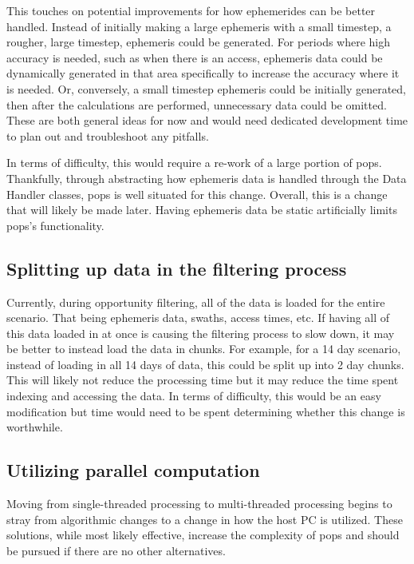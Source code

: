 This touches on potential improvements for how ephemerides can be better
handled.  Instead of initially making a large ephemeris with a small timestep,
a rougher, large timestep, ephemeris could be generated.  For periods where
high accuracy is needed, such as when there is an access, ephemeris data could
be dynamically generated in that area specifically to increase the accuracy
where it is needed. Or, conversely, a small timestep ephemeris could be
initially generated, then after the calculations are performed, unnecessary
data could be omitted. These are both general ideas for now and would need
dedicated development time to plan out and troubleshoot any pitfalls.

In terms of difficulty, this would require a re-work of a large portion of
\gls{pops}.  Thankfully, through abstracting how ephemeris data is handled
through the Data Handler classes, \gls{pops} is well situated for this change.
Overall, this is a change that will likely be made later.  Having ephemeris
data be static artificially limits \gls{pops}'s functionality.


\subsection{Splitting up data in the filtering process}

Currently, during opportunity filtering, all of the data is loaded for the
entire scenario. That being ephemeris data, swaths, access times, etc. If
having all of this data loaded in at once is causing the filtering process to
slow down, it may be better to instead load the data in chunks. For example,
for a 14 day scenario, instead of loading in all 14 days of data, this could be
split up into 2 day chunks. This will likely not reduce the processing time but
it may reduce the time spent indexing and accessing the data. In terms of
difficulty, this would be an easy modification but time would need to be spent
determining whether this change is worthwhile.


\subsection{Utilizing parallel computation}

Moving from single-threaded processing to multi-threaded processing begins to
stray from algorithmic changes to a change in how the host PC is utilized.
These solutions, while most likely effective, increase the complexity of
\gls{pops} and should be pursued if there are no other alternatives.

